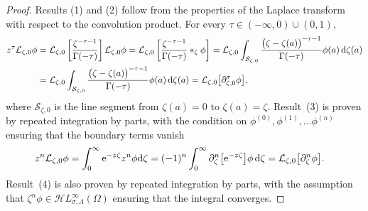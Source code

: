 \documentclass[10pt,a4paper]{amsart}
\newcommand{\singexp}[2]{\mathcal{H}L^\infty_{#1, #2}}
\newcommand{\fracderiv}[3]{\partial^{#1}_{#2, #3}}
\newcommand{\laplace}{\mathcal{L}}
\numberwithin{equation}{section}
\begin{document}
\begin{proof}
Results (1) and (2) follow from the properties of the Laplace transform with respect to the convolution product. For every $\tau \in (-\infty, 0) \cup (0,1)$,
\begin{align*}
z^\tau\laplace_{\zeta,0}\phi&=\laplace_{\zeta,0}\left[\frac{\zeta^{-\tau-1}}{\Gamma(-\tau)}\right] \laplace_{\zeta,0}\phi=\laplace_{\zeta,0}\left[\frac{\zeta^{-\tau-1}}{\Gamma(-\tau)} \ast_\zeta \phi\right] =\laplace_{\zeta,0} \int_{\mathcal{S}_{\zeta,0}}\frac{\bigl(\zeta-\zeta(a)\bigr)^{-\tau-1}}{\Gamma(-\tau)} \phi(a)\, {\rm d}\zeta(a)\\
&=\laplace_{\zeta,0} \int_{\mathcal{S}_{\zeta,0} }\frac{\bigl(\zeta-\zeta(a)\bigr)^{-\tau-1}}{\Gamma(-\tau)} \phi(a) \, {\rm d}\zeta(a)=\laplace_{\zeta,0}\bigl[\fracderiv{\tau}{\zeta}{0}\phi\bigr],
\end{align*}
where $\mathcal{S}_{\zeta,0}$ is the line segment from $\zeta(a)=0$ to $\zeta(a) = \zeta$. Result~(3) is proven by repeated integration by parts, with the condition on $\phi^{(0)}, \phi^{(1)}, \dots \phi^{(n)}$ ensuring that the boundary terms vanish
\begin{align*}
 z^n\laplace_{\zeta,0}\phi&=\int_0^\infty {\rm e}^{-z\zeta} z^n \phi {\rm d}\zeta=(-1)^n\int_0^\infty \partial_\zeta^n \bigl[{\rm e}^{-z\zeta}\bigr] \phi \, {\rm d}\zeta=\laplace_{\zeta,0}\bigl[\partial_\zeta^n \phi\bigr].
\end{align*}
Result~(4) is also proven by repeated integration by parts, with the assumption that $\zeta^n\phi\in\singexp{\sigma}{\Lambda}(\Omega)$ ensuring that the integral converges.
\end{proof}
\end{document}
